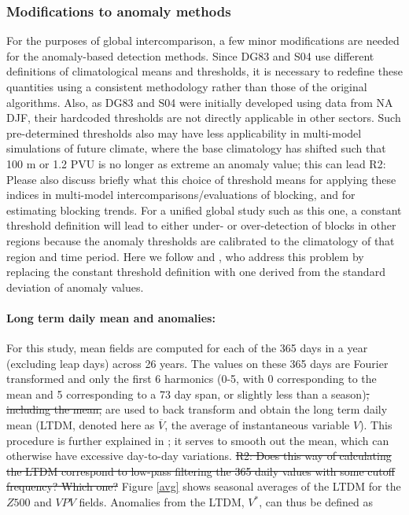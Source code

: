 \documentclass[smallextended]{svjour3}       %
\numberwithin{equation}{section}
\begin{document}
\subsubsection{Modifications to anomaly methods}\label{modanom}

For the purposes of global intercomparison, a few minor modifications are needed for the anomaly-based detection methods. Since DG83 and S04 use different definitions of climatological means and thresholds, it is necessary to redefine these quantities using a consistent methodology rather than those of the original algorithms. Also, as DG83 and S04 were initially developed using data from NA DJF, their hardcoded thresholds are not directly applicable in other sectors.{\color{blue} Such pre-determined thresholds also may have less applicability in multi-model simulations of future climate, where the base climatology has shifted such that 100 m or 1.2 PVU is no longer as extreme an anomaly value; this can lead }{\color{teal}R2: Please also discuss briefly what this choice of threshold means for applying these indices in multi-model intercomparisons/evaluations of blocking, and for estimating blocking trends.} 
For a unified global study such as this one, a constant threshold definition will lead to either under- or over-detection of blocks in other regions because the anomaly thresholds are calibrated to the climatology of that region and time period. Here we follow \cite{barriopedro_application_2010} and \cite{dunn-sigouin_evaluation_2012}, who address this problem by replacing the constant threshold definition with one derived from the standard deviation of anomaly values. 

\paragraph{Long term daily mean and anomalies:}  For this study, mean fields are computed for each of the 365 days in a year (excluding leap days) across 26 years. The values on these 365 days are Fourier transformed and only the first 6 harmonics {\color{blue}(0-5, with 0 corresponding to the mean and 5 corresponding to a 73 day span, or slightly less than a season)\sout{, including the mean, }}are used to back transform and obtain the long term daily mean (LTDM, denoted here as $\overline{V}$, the average of instantaneous variable $V$). This procedure is further explained in \cite{grotjahn_synoptic_2017}; it serves to smooth out the mean, which can otherwise have excessive day-to-day variations. 
{\color{teal}\sout{R2: Does this way of calculating the LTDM correspond to low-pass filtering the 365 daily values with some cutoff frequency? Which one?}}
Figure \ref{avg} shows seasonal averages of the LTDM for the $Z500$ and $VPV$ fields. Anomalies from the LTDM, $V^*$, can thus be defined as 
\end{document}
